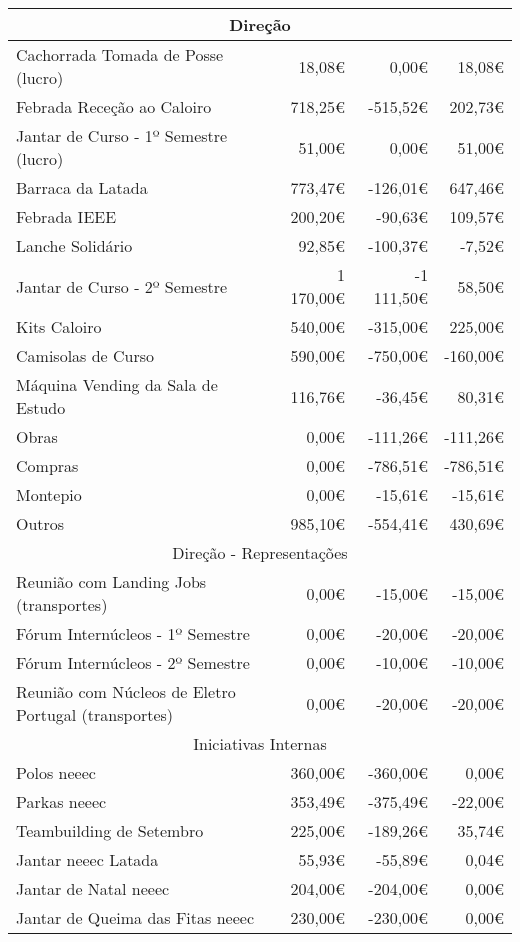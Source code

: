 \begin{longtable}{Xrrr}
\hline
\multicolumn{4}{c}{Direção} \\
\hline
Cachorrada Tomada de Posse (lucro) & 18,08€ & 0,00€ & 18,08€ \\
Febrada Receção ao Caloiro & 718,25€ & -515,52€ & 202,73€ \\
Jantar de Curso - 1º Semestre (lucro) & 51,00€ & 0,00€ & 51,00€ \\
Barraca da Latada & 773,47€ & -126,01€ & 647,46€ \\
Febrada IEEE & 200,20€ & -90,63€ & 109,57€ \\
Lanche Solidário & 92,85€ & -100,37€ & -7,52€ \\
Jantar de Curso - 2º Semestre & 1 170,00€ & -1 111,50€ & 58,50€ \\
Kits Caloiro & 540,00€ & -315,00€ & 225,00€ \\
Camisolas de Curso & 590,00€ & -750,00€ & -160,00€ \\
Máquina Vending da Sala de Estudo & 116,76€ & -36,45€ & 80,31€ \\
Obras & 0,00€ & -111,26€ & -111,26€ \\
Compras & 0,00€ & -786,51€ & -786,51€ \\
Montepio & 0,00€ & -15,61€ & -15,61€ \\
Outros & 985,10€ & -554,41€ & 430,69€ \\

\hline
\multicolumn{4}{c}{Direção - Representações} \\
\hline
Reunião com Landing Jobs (transportes) & 0,00€ & -15,00€ & -15,00€ \\
Fórum Internúcleos - 1º Semestre & 0,00€ & -20,00€ & -20,00€ \\
Fórum Internúcleos - 2º Semestre & 0,00€ & -10,00€ & -10,00€ \\
Reunião com Núcleos de Eletro Portugal (transportes) & 0,00€ & -20,00€ & -20,00€ \\

\hline
\multicolumn{4}{c}{Iniciativas Internas} \\
\hline
Polos \acrshort{neeec} & 360,00€ & -360,00€ & 0,00€ \\
Parkas \acrshort{neeec} & 353,49€ & -375,49€ & -22,00€ \\
Teambuilding de Setembro & 225,00€ & -189,26€ & 35,74€ \\
Jantar \acrshort{neeec} Latada & 55,93€ & -55,89€ & 0,04€ \\
Jantar de Natal \acrshort{neeec} & 204,00€ & -204,00€ & 0,00€ \\
Jantar de Queima das Fitas \acrshort{neeec} & 230,00€ & -230,00€ & 0,00€ \\


\end{longtable}
